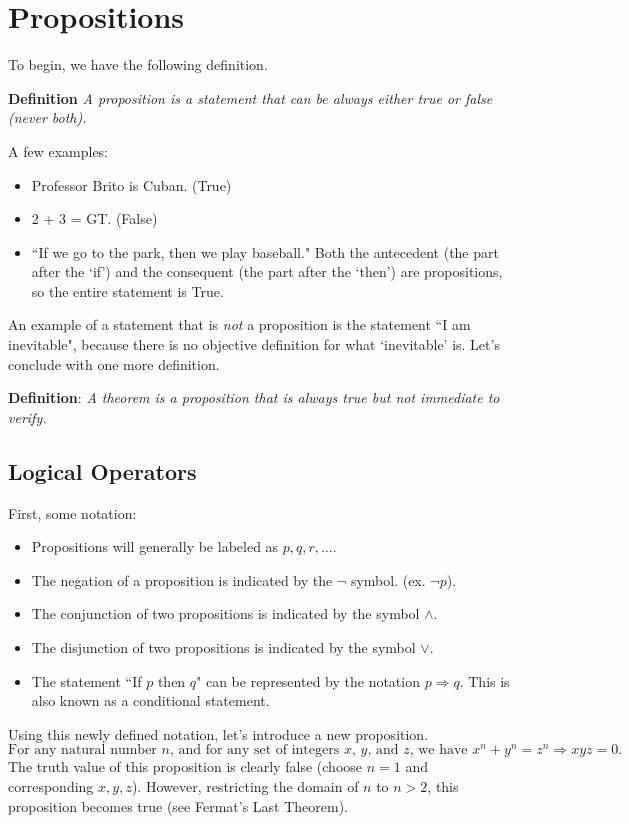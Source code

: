 \documentclass{article}
\begin{document}
\section*{Propositions}
    To begin, we have the following definition.
    
    \vspace{1.5mm}
    \textbf{Definition} \textit{A proposition is a statement that can be always either true or false  (never both).}
    
    \vspace{1.5mm}
    A few examples:
    \begin{itemize}
        \item Professor Brito is Cuban. (True)
        \item 2 + 3 = GT. (False)
        \item ``If we go to the park, then we play baseball." Both the antecedent (the part after the `if') and the consequent (the part after the `then') are propositions, so the entire statement is True.
    \end{itemize}
    
    An example of a statement that is \textit{not} a proposition  is the statement ``I am inevitable", because there is no objective definition for what `inevitable' is. Let's conclude with one more definition.
    
    \vspace{1.5mm}
    \textbf{Definition}: \textit{A theorem is a proposition that is always true but not immediate to verify.}

\subsection*{Logical Operators}
    First, some notation:
    \begin{itemize}
        \item Propositions will generally be labeled as $p, q, r, \dots$.
        \item The negation of a proposition is indicated by the $\neg$ symbol. (ex. $\neg p$).
        \item The conjunction of two propositions is indicated by the symbol $\land$.
        \item The disjunction of two propositions is indicated by the symbol $\lor$.
        \item The statement ``If $p$ then $q$" can be represented by the notation $p \Rightarrow q$. This is also known as a conditional statement.
    \end{itemize}
    Using this newly defined notation, let's introduce a new proposition. $$ \text{For any natural number $n$, and for any set of integers $x$, $y$, and $z$, we have $x^n + y^n = z^n \Rightarrow xyz = 0$.}$$ The truth value of this proposition is clearly false (choose $n = 1$ and corresponding $x, y, z$). However, restricting the domain of $n$ to $n > 2$, this proposition becomes true (see Fermat's Last Theorem).
    
\end{document}
